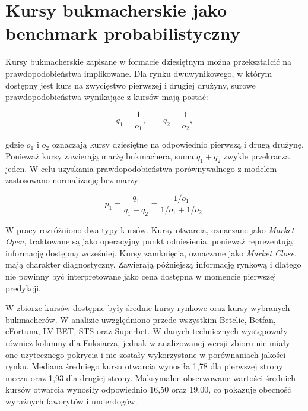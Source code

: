 \section{Kursy bukmacherskie jako benchmark probabilistyczny}

Kursy bukmacherskie zapisane w formacie dziesiętnym można przekształcić na prawdopodobieństwa implikowane. Dla rynku dwuwynikowego, w którym dostępny jest kurs na zwycięstwo pierwszej i drugiej drużyny, surowe prawdopodobieństwa wynikające z kursów mają postać:

\begin{equation}
    q_1 = \frac{1}{o_1}, \qquad q_2 = \frac{1}{o_2},
\end{equation}

gdzie \(o_1\) i \(o_2\) oznaczają kursy dziesiętne na odpowiednio pierwszą i drugą drużynę. Ponieważ kursy zawierają marżę bukmachera, suma \(q_1 + q_2\) zwykle przekracza jeden. W celu uzyskania prawdopodobieństwa porównywalnego z modelem zastosowano normalizację bez marży:

\begin{equation}
    p_1 = \frac{q_1}{q_1 + q_2}
    = \frac{1/o_1}{1/o_1 + 1/o_2}.
\end{equation}

W pracy rozróżniono dwa typy kursów. Kursy otwarcia, oznaczane jako \textit{Market Open}, traktowane są jako operacyjny punkt odniesienia, ponieważ reprezentują informację dostępną wcześniej. Kursy zamknięcia, oznaczane jako \textit{Market Close}, mają charakter diagnostyczny. Zawierają późniejszą informację rynkową i dlatego nie powinny być interpretowane jako cena dostępna w momencie pierwszej predykcji.

W zbiorze kursów dostępne były średnie kursy rynkowe oraz kursy wybranych bukmacherów. W analizie uwzględniono przede wszystkim Betclic, Betfan, eFortuna, LV BET, STS oraz Superbet. W danych technicznych występowały również kolumny dla Fuksiarza, jednak w analizowanej wersji zbioru nie miały one użytecznego pokrycia i nie zostały wykorzystane w porównaniach jakości rynku. Mediana średniego kursu otwarcia wynosiła 1{,}78 dla pierwszej strony meczu oraz 1{,}93 dla drugiej strony. Maksymalne obserwowane wartości średnich kursów otwarcia wynosiły odpowiednio 16{,}50 oraz 19{,}00, co pokazuje obecność wyraźnych faworytów i underdogów.

